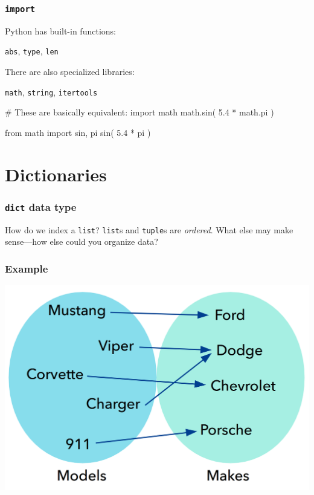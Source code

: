 \documentclass[11pt]{beamer}
\begin{document}
\begin{frame}[fragile]
  \frametitle{\texttt{import}}
  \Enlarge

  \begin{itemize}
  \myitem  Python has built-in functions:
    \begin{itemize}
    \mysubitem  \texttt{abs}, \texttt{type}, \texttt{len}
    \end{itemize} %
  \myitem  There are also specialized libraries:
    \begin{itemize}
    \mysubitem  \texttt{math}, \texttt{string}, \texttt{itertools}
    \end{itemize} %
  \end{itemize}
  \begin{semiverbatim}
# These are basically equivalent:
import math
math.sin( 5.4 * math.pi )

from math import sin, pi
sin( 5.4 * pi )
  \end{semiverbatim}
\end{frame}

\section{Dictionaries}

\begin{frame}[fragile]
  \frametitle{\texttt{dict} data type}
  \Enlarge

  \begin{itemize}
  \myitem  How do we index a \texttt{list}? %
  \myitem  \texttt{list}s and \texttt{tuple}s are \emph{ordered}.
  \myitem  What else may make sense---how else could you organize data?
  \end{itemize}
\end{frame}

\begin{frame}[fragile]
  \frametitle{Example}

  \includegraphics[height=0.75\textheight]{./img/dict-01.png}
\end{frame}
\end{document}
